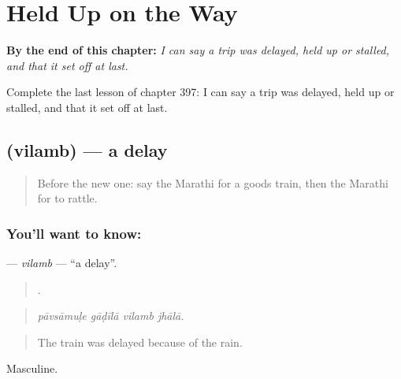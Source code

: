 
\chapter{Held Up on the Way}
\label{ch:mr-held-up-on-the-way}

\begin{chapteropening}
\textbf{By the end of this chapter:} \emph{I can say a trip was delayed, held up or stalled, and that it set off at last.}

Complete the last lesson of chapter 397: I can say a trip was delayed, held up or stalled, and that it set off at last.
\end{chapteropening}

\section[\texorpdfstring{\mr{विलंब} (vilamb)}{विलंब (vilamb)}]{ (vilamb) — a delay}

\label{lesson:MR-C397-vilamb}



\begin{quote}
Before the new one: say the Marathi for a goods train, then the Marathi for to rattle.
\end{quote}

\subsection*{You'll want to know: }
\textbf{} — \emph{vilamb} — \textquotedblleft{}a delay\textquotedblright{}.

\begin{quote}
   .
\end{quote}

\begin{quote}
\emph{pāvsāmuḷe gāḍīlā vilamb jhālā.}
\end{quote}

\begin{quote}
The train was delayed because of the rain.
\end{quote}

Masculine.

